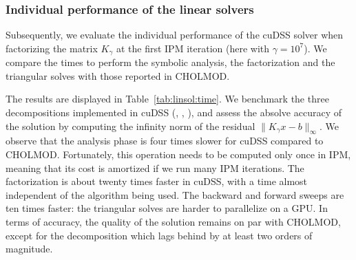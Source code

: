 \subsubsection{Individual performance of the linear solvers}
Subsequently, we evaluate the individual performance of the cuDSS solver when factorizing the matrix $K_{\gamma}$ at the first IPM iteration (here with $\gamma = 10^7$).
We compare the times to perform the symbolic analysis,
the factorization and the triangular solves with those reported in CHOLMOD.

The results are displayed in Table~\ref{tab:linsol:time}.
We benchmark the three decompositions implemented in cuDSS (\llt, \ldlt, \lu), and assess the absolve accuracy of the solution by computing the infinity norm of the residual $\|K_\gamma x - b \|_\infty$.
We observe that the analysis phase is four times slower for cuDSS compared to CHOLMOD.
Fortunately, this operation needs to be computed only once in IPM, meaning that its cost is amortized if we run many IPM iterations.
The factorization is about twenty times faster in cuDSS, with a time almost independent of the algorithm being used.
The backward and forward sweeps are ten times faster:
the triangular solves are harder to parallelize on a GPU.
In terms of accuracy, the quality of the solution remains on par with CHOLMOD, except for the \ldlt decomposition which lags behind by at least two orders of magnitude.


